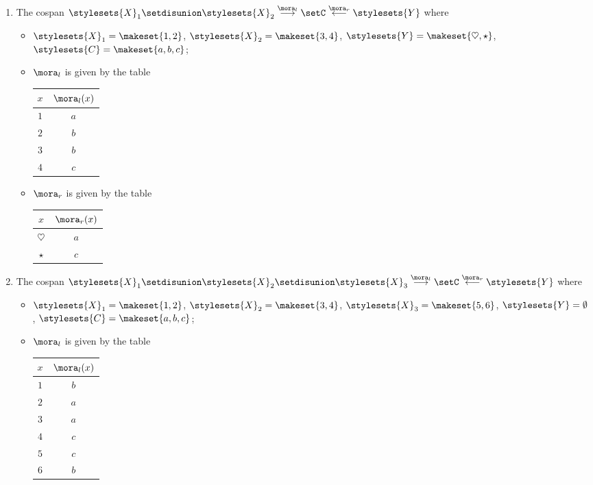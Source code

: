 \begin{gradedexercise}
\begin{enumerate}
\item The cospan $\stylesets{X}_1 \setdisunion \stylesets{X}_2 \overset{\mora_l}{\longrightarrow} \setC \overset{\mora_r}{\longleftarrow}  \stylesets{Y}$ where 
\begin{itemize}
\item $\stylesets{X}_1 = \makeset{1, 2}$, $\stylesets{X}_2 = \makeset{3, 4}$, $\stylesets{Y} = \makeset{\heartsuit, \star}$, $\stylesets{C} = \makeset{a, b, c}$;
\item $\mora_l$ is given by the table
\begin{center}
\begin{tabular}{c|c}
$x$ & $\mora_l(x)$\\
\hline
$1$ & $a$ \\
$2$ & $b$ \\
$3$ & $b$ \\
$4$ & $c$ 
\end{tabular}
\end{center}
\item $\mora_r$ is given by the table
\begin{center}
\begin{tabular}{c|c}
$x$ & $\mora_r(x)$\\
\hline
$\heartsuit$ & $a$ \\
$\star$ & $c$ 
\end{tabular}
\end{center}
\end{itemize}
\item The cospan $\stylesets{X}_1 \setdisunion \stylesets{X}_2 \setdisunion \stylesets{X}_3 \overset{\mora_l}{\longrightarrow} \setC \overset{\mora_r}{\longleftarrow} \stylesets{Y}$ where 
\begin{itemize}
\item $\stylesets{X}_1 = \makeset{1, 2}$, $\stylesets{X}_2 = \makeset{3, 4}$, $\stylesets{X}_3 = \makeset{5, 6}$, $\stylesets{Y} = \emptyset$, $\stylesets{C} = \makeset{a, b, c}$;
\item $\mora_l$ is given by the table
\begin{center}
\begin{tabular}{c|c}
$x$ & $\mora_l(x)$\\
\hline
$1$ & $b$ \\
$2$ & $a$ \\
$3$ & $a$ \\
$4$ & $c$ \\
$5$ & $c$ \\
$6$ & $b$ 
\end{tabular}

\end{center}
\end{itemize}
\end{enumerate}
\end{gradedexercise}
